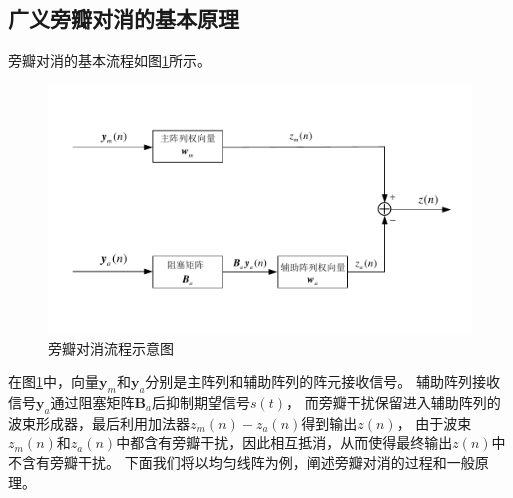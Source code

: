 \documentclass[master]{thesis-uestc}
\begin{document}
\subsection{广义旁瓣对消的基本原理}
旁瓣对消的基本流程如图\ref{GSC_process}所示。
\begin{figure}[h]
    \includegraphics[scale=0.8]{pic/GSC_process.pdf}
    \caption{旁瓣对消流程示意图}
    \label{GSC_process}
\end{figure}
在图\ref{GSC_process}中，向量$\bm{y}_m$和$\bm{y}_a$分别是主阵列和辅助阵列的阵元接收信号。
辅助阵列接收信号$\bm{y}_a$通过阻塞矩阵$\bm{B}_a$后抑制期望信号$s(t)$，
而旁瓣干扰保留进入辅助阵列的波束形成器，最后利用加法器$z_m(n)-z_a(n)$得到输出$z(n)$，
由于波束$z_m(n)$和$z_a(n)$中都含有旁瓣干扰，因此相互抵消，从而使得最终输出$z(n)$中不含有旁瓣干扰。
下面我们将以均匀线阵为例，阐述旁瓣对消的过程和一般原理。
\end{document}
